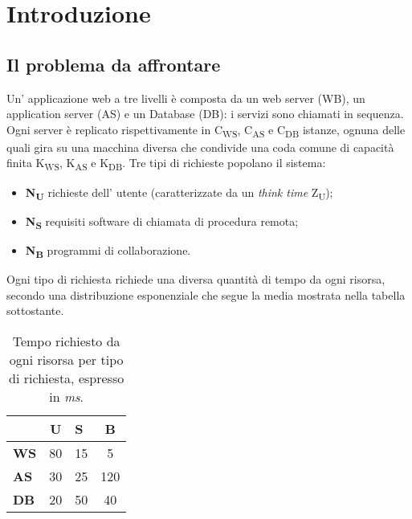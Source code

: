 \documentclass[../main.tex]{subfiles}
\begin{document}
    \chapter{Introduzione}\label{ch:introduzione}
    \section{Il problema da affrontare}\label{sec:Il-problema-da-affrontare}
    Un' applicazione web a tre livelli è composta da un web server (WB), un application server (AS) e un Database (DB):
    i servizi sono chiamati in sequenza.
    Ogni server è replicato rispettivamente in C\textsubscript{WS}, C\textsubscript{AS} e C\textsubscript{DB} istanze,
    ognuna delle quali gira su una macchina diversa che condivide una coda comune di capacità finita K\textsubscript{WS},
    K\textsubscript{AS} e K\textsubscript{DB}.
    \newline Tre tipi di richieste popolano il sistema:
    \begin{itemize}
        \item \textbf{N\textsubscript{U}} richieste dell' utente (caratterizzate da un \textit{think time} Z\textsubscript{U});
        \item \textbf{N\textsubscript{S}} requisiti software di chiamata di procedura remota;
        \item \textbf{N\textsubscript{B}} programmi di collaborazione.
    \end{itemize}
    Ogni tipo di richiesta richiede una diversa quantità di tempo da ogni risorsa, secondo una distribuzione
    esponenziale che segue la media mostrata nella tabella sottostante.
    \begin{table}[h]
        \centering
        \begin{tabular}{|l|c|l|c|}
            \hline
            & \textbf{U} & \textbf{S} & \textbf{B} \\ [0.5ex]
            \hline
            \textbf{WS} & 80         & 15         & 5          \\
            \textbf{AS} & 30         & 25         & 120        \\
            \textbf{DB} & 20         & 50         & 40         \\
            \hline
        \end{tabular}
        \caption{Tempo richiesto da ogni risorsa per tipo di richiesta, espresso in \textit{ms}.}
        \label{tab:tempo-richiesto-da-ogni-risorsa-per-tipo-di-richiesta}
    \end{table}
\end{document}
